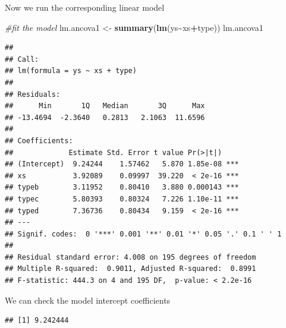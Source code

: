 \documentclass[
]{book}
\newenvironment{Shaded}{\begin{snugshade}}{\end{snugshade}}
\newcommand{\CommentTok}[1]{\textcolor[rgb]{0.56,0.35,0.01}{\textit{#1}}}
\newcommand{\DecValTok}[1]{\textcolor[rgb]{0.00,0.00,0.81}{#1}}
\newcommand{\FunctionTok}[1]{\textcolor[rgb]{0.13,0.29,0.53}{\textbf{#1}}}
\newcommand{\NormalTok}[1]{#1}
\newcommand{\OtherTok}[1]{\textcolor[rgb]{0.56,0.35,0.01}{#1}}
\newcommand{\SpecialCharTok}[1]{\textcolor[rgb]{0.81,0.36,0.00}{\textbf{#1}}}
\begin{document}
Now we run the corresponding linear model

\begin{Shaded}
\begin{Highlighting}[]
\CommentTok{\#fit the model}
\NormalTok{lm.ancova1 }\OtherTok{\textless{}{-}} \FunctionTok{summary}\NormalTok{(}\FunctionTok{lm}\NormalTok{(ys}\SpecialCharTok{\textasciitilde{}}\NormalTok{xs}\SpecialCharTok{+}\NormalTok{type))}
\NormalTok{lm.ancova1}
\end{Highlighting}
\end{Shaded}

\begin{verbatim}
## 
## Call:
## lm(formula = ys ~ xs + type)
## 
## Residuals:
##      Min       1Q   Median       3Q      Max 
## -13.4694  -2.3640   0.2813   2.1063  11.6596 
## 
## Coefficients:
##             Estimate Std. Error t value Pr(>|t|)    
## (Intercept)  9.24244    1.57462   5.870 1.85e-08 ***
## xs           3.92089    0.09997  39.220  < 2e-16 ***
## typeb        3.11952    0.80410   3.880 0.000143 ***
## typec        5.80393    0.80324   7.226 1.10e-11 ***
## typed        7.36736    0.80434   9.159  < 2e-16 ***
## ---
## Signif. codes:  0 '***' 0.001 '**' 0.01 '*' 0.05 '.' 0.1 ' ' 1
## 
## Residual standard error: 4.008 on 195 degrees of freedom
## Multiple R-squared:  0.9011, Adjusted R-squared:  0.8991 
## F-statistic: 444.3 on 4 and 195 DF,  p-value: < 2.2e-16
\end{verbatim}

We can check the model intercept coefficients

\begin{Shaded}
\end{Shaded}

\begin{verbatim}
## [1] 9.242444
\end{verbatim}

\begin{Shaded}
\end{Shaded}
\end{document}
